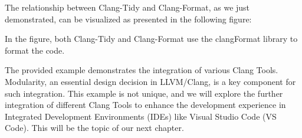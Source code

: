 The relationship between Clang-Tidy and Clang-Format, as we just demonstrated, can be visualized as presented in the following figure:




In the figure, both Clang-Tidy and Clang-Format use the clangFormat library to format the code.

The provided example demonstrates the integration of various Clang Tools. Modularity, an essential design decision in LLVM/Clang, is a key component for such integration. This example is not unique, and we will explore the further integration of different Clang Tools to enhance the development experience in Integrated Development Environments (IDEs) like Visual Studio Code (VS Code). This will be the topic of our next chapter.












































































